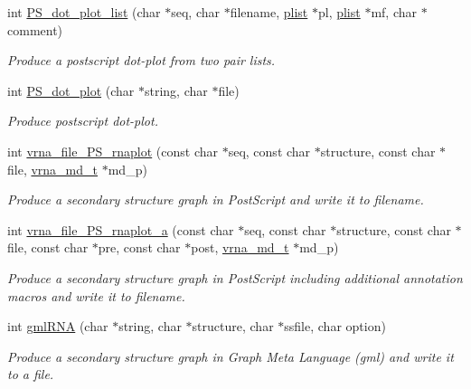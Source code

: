 \begin{DoxyCompactItemize}
int \hyperlink{group__plotting__utils_ga00ea223b5cf02eb2faae5ff29f0d5e12}{P\+S\+\_\+dot\+\_\+plot\+\_\+list} (char $\ast$seq, char $\ast$filename, \hyperlink{group__data__structures_ga9608eed021ebfbdd7a901cfdc446c8e9}{plist} $\ast$pl, \hyperlink{group__data__structures_ga9608eed021ebfbdd7a901cfdc446c8e9}{plist} $\ast$mf, char $\ast$comment)
\begin{DoxyCompactList}\small\item\em Produce a postscript dot-\/plot from two pair lists. \end{DoxyCompactList}\item 
int \hyperlink{group__plotting__utils_ga689a97a7e3b8a2df14728b8204d9d57b}{P\+S\+\_\+dot\+\_\+plot} (char $\ast$string, char $\ast$file)
\begin{DoxyCompactList}\small\item\em Produce postscript dot-\/plot. \end{DoxyCompactList}\item 
int \hyperlink{group__plotting__utils_gabdc8f6548ba4a3bc3cd868ccbcfdb86a}{vrna\+\_\+file\+\_\+\+P\+S\+\_\+rnaplot} (const char $\ast$seq, const char $\ast$structure, const char $\ast$file, \hyperlink{group__model__details_ga1f8a10e12a0a1915f2a4eff0b28ea17c}{vrna\+\_\+md\+\_\+t} $\ast$md\+\_\+p)
\begin{DoxyCompactList}\small\item\em Produce a secondary structure graph in Post\+Script and write it to \textquotesingle{}filename\textquotesingle{}. \end{DoxyCompactList}\item 
int \hyperlink{group__plotting__utils_ga139a31dd0ba9fc6612431f67de901c31}{vrna\+\_\+file\+\_\+\+P\+S\+\_\+rnaplot\+\_\+a} (const char $\ast$seq, const char $\ast$structure, const char $\ast$file, const char $\ast$pre, const char $\ast$post, \hyperlink{group__model__details_ga1f8a10e12a0a1915f2a4eff0b28ea17c}{vrna\+\_\+md\+\_\+t} $\ast$md\+\_\+p)
\begin{DoxyCompactList}\small\item\em Produce a secondary structure graph in Post\+Script including additional annotation macros and write it to \textquotesingle{}filename\textquotesingle{}. \end{DoxyCompactList}\item 
int \hyperlink{group__plotting__utils_ga70834bc8c0aad4fe6824ff76ccb8f329}{gml\+R\+NA} (char $\ast$string, char $\ast$structure, char $\ast$ssfile, char option)
\begin{DoxyCompactList}\small\item\em Produce a secondary structure graph in Graph Meta Language (gml) and write it to a file. \end{DoxyCompactList}\item 

\end{DoxyCompactItemize}
